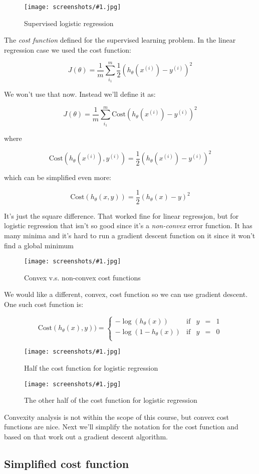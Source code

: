 \documentclass[a4, 12pt, english, USenglish]{scrreprt}
\newcommand{\screenshot}[2]{
\begin{figure}[htb]
\texttt{[image: screenshots/\#1.jpg]}
\label{#1}
\caption{#2}
\end{figure}}
\newcommand{\parens}[1]{\ensuremath{\left({#1}\right)}}
\newcommand{\idx}[1]{{\em #1}\index{#1}}
\begin{document}
\screenshot{supervised-logistic-regression}{Supervised logistic regression}

The \idx{cost function} defined for the supervised learning problem.
In the linear regression case we used the cost function:


\[
     J(\theta) = \frac{1}{m} \sum_{i_1}^m \frac{1}{2} \parens{h_{\theta}(x^{(i)}) - y^{(i)}}^2
\]


We won't use that now.  Instead we'll  define it as:


\[
     J(\theta) = \frac{1}{m} \sum_{i_1}^m \mbox{Cost}\parens{h_{\theta}(x^{(i)}) - y^{(i)}}^2
\]


where 


\[
 \mbox{Cost}\parens{h_\theta (x^{(i)}),  y^{(i)}} = \frac{1}{2} \parens{h_\theta(x^{(i)}) - y^{(i)}}^2
\]


which can be simplified even more:

\[
 \mbox{Cost}\parens{h_\theta (x,  y)} = \frac{1}{2} \parens{h_\theta(x) - y}^2
\]

It's just the square difference.  That worked fine for linear
regressjon, but for logistic regression that isn't so good since it's
a \idx{non-convex} error function.  It has many minima and it's hard
to run a gradient descent function on it since it won't find  a global minimum


\screenshot{nonconvex}{Convex v.s. non-convex cost functions}

We would like a different, convex, cost function so we can use
gradient descent.   One such cost function is:

\[
\mbox{Cost}(h_\theta(x), y)) = \left\{
\begin{array}{rcclcl}
-\log(h_\theta(x)) &\mbox{if} &y&=& 1 \\
-\log(1-h_\theta(x)) &\mbox{if} &y&=& 0 \\
\end{array}\right.
\]

\screenshot{logregcost}{Half the  cost function for logistic regression}

\screenshot{logregcost1}{The other half of the cost function for
  logistic regression}

Convexity analysis is not within the scope of this course, but convex
cost functions are nice.    Next we'll simplify the notation for the
cost function and based on that work out a gradient descent algorithm.


\subsection{Simplified cost function}
\end{document}
